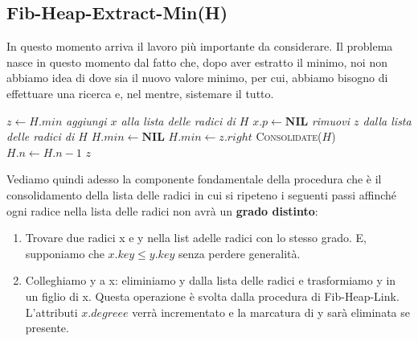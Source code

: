 \subsection{Fib-Heap-Extract-Min(H)}
In questo momento arriva il lavoro più importante da considerare. Il problema nasce in questo momento dal fatto che, dopo aver estratto il minimo, noi non abbiamo idea di dove sia il nuovo valore minimo, per cui, abbiamo bisogno di effettuare una ricerca e, nel mentre, sistemare il tutto.
\begin{algorithm}[H]
\caption{FIB-HEAP-EXTRACT-MIN($H$)}
\begin{algorithmic}[1]
    \State $z \gets H.min$
            \State \textit{aggiungi $x$ alla lista delle radici di $H$} 
            \State $x.p \gets \textbf{NIL}$
        \EndFor
        \State \textit{rimuovi $z$ dalla lista delle radici di $H$}
         
            \State $H.min \gets \textbf{NIL}$
        \Else
            \State $H.min \gets z.right$
        \EndIf
        \State \textsc{Consolidate}($H$) 
        \State $H.n \gets H.n - 1$
    \EndIf
    \State \Return $z$
\end{algorithmic}
\end{algorithm}

Vediamo quindi adesso la componente fondamentale della procedura che è il consolidamento della lista delle radici in cui si ripeteno i seguenti passi affinché ogni radice nella lista delle radici non avrà un \textbf{grado distinto}:
\begin{enumerate}
    \item  Trovare due radici x e y nella list adelle radici con lo stesso grado. E, supponiamo che $x.key \leq y.key$ senza perdere generalità.
    \item Colleghiamo y a x: eliminiamo y dalla lista delle radici e trasformiamo y in un figlio di x. Questa operazione è svolta dalla procedura di Fib-Heap-Link. L'attributi $x.degreee$ verrà incrementato e la marcatura di y sarà eliminata se presente.
\end{enumerate}

